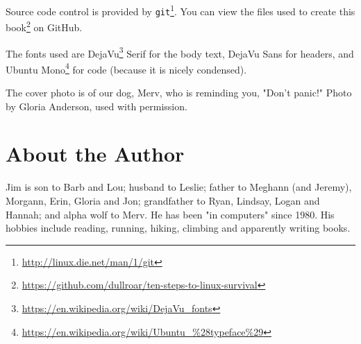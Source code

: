 \documentclass[10pt,american,]{book}
\makeatletter
\renewcommand{\href}[2]{#2\footnote{\url{#1}}}
\numberwithin{figure}{chapter}
\DeclareRobustCommand{\drcmd}[1]{
    \index{commands!#1@\texttt{#1}}
}
\makeatother
\begin{document}
Source code control is provided by
\href{http://linux.die.net/man/1/git}{\texttt{git}}. You can view
\href{https://github.com/dullroar/ten-steps-to-linux-survival}{the files
used to create this book} on GitHub. \drcmd{git}

The fonts used are
\href{https://en.wikipedia.org/wiki/DejaVu_fonts}{DejaVu} Serif for the
body text, DejaVu Sans for headers, and
\href{https://en.wikipedia.org/wiki/Ubuntu_\%28typeface\%29}{Ubuntu
Mono} for code (because it is nicely condensed).

The cover photo is of our dog, Merv, who is reminding you, "Don't
panic!" Photo by Gloria Anderson, used with permission.

\section*{About the Author}\label{about-the-author}

Jim is son to Barb and Lou; husband to Leslie; father to Meghann (and
Jeremy), Morgann, Erin, Gloria and Jon; grandfather to Ryan, Lindsay,
Logan and Hannah; and alpha wolf to Merv. He has been "in computers"
since 1980. His hobbies include reading, running, hiking, climbing and
apparently writing books.

\cleardoublepage
{}
\printindex
\end{document}
